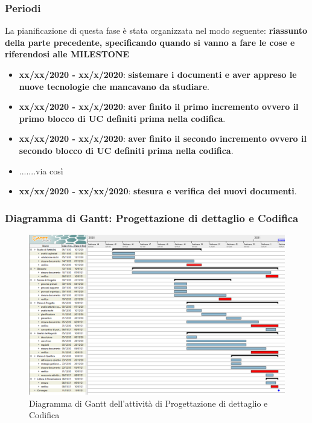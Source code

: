 \subsubsection{Periodi}
La pianificazione di questa fase è stata organizzata nel modo seguente:
\textbf{riassunto della parte precedente, specificando quando si vanno a fare le cose e riferendosi alle MILESTONE}
\begin{itemize}
\item \textbf{xx/xx/2020 - xx/x/2020}: \textbf{sistemare i documenti e aver appreso le nuove tecnologie che mancavano da studiare}.

\item \textbf{xx/xx/2020 - xx/x/2020}: \textbf{aver finito il primo incremento ovvero il primo blocco di UC definiti prima nella codifica}.

\item \textbf{xx/xx/2020 - xx/x/2020}: \textbf{aver finito il secondo incremento ovvero il secondo blocco di UC definiti prima nella codifica}.

\item .......via così

\item \textbf{xx/xx/2020 - xx/xx/2020}: \textbf{stesura e verifica dei nuovi documenti}.
\end{itemize}

\subsubsection{Diagramma di Gantt: Progettazione di dettaglio e Codifica}
\begin{figure}[h]
	\includegraphics[scale=0.45]{Images/GanttPianificazioneAnalisi.PNG}
	\caption{Diagramma di Gantt dell'attività di Progettazione di dettaglio e Codifica}
\end{figure}